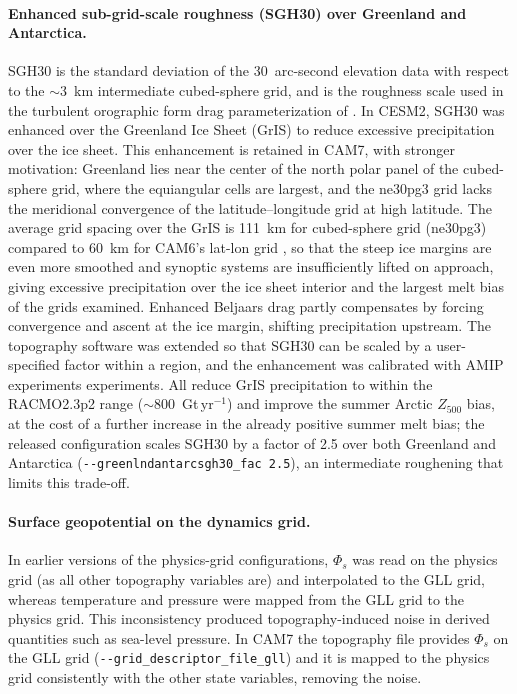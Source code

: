 \documentclass[draft]{agujournal2019}
\begin{document}
\paragraph{Enhanced sub-grid-scale roughness (SGH30) over Greenland and Antarctica.} SGH30 is the standard deviation of the 30~arc-second elevation data with respect to the $\sim$3~km intermediate cubed-sphere grid, and is the roughness scale used in the turbulent orographic form drag parameterization of . In CESM2, SGH30 was enhanced over the Greenland Ice Sheet (GrIS) to reduce excessive precipitation over the ice sheet. This enhancement is retained in CAM7, with stronger motivation: Greenland lies near the center of the north polar panel of the cubed-sphere grid, where the equiangular cells are largest, and the ne30pg3 grid lacks the meridional convergence of the latitude--longitude grid at high latitude. The average grid spacing over the GrIS is 111~km for cubed-sphere grid (ne30pg3) compared to 60~km for CAM6's lat-lon grid  \cite{refprof}, so that the steep ice margins are even more smoothed and synoptic systems are insufficiently lifted on approach, giving excessive precipitation over the ice sheet interior and the largest melt bias of the grids examined. Enhanced Beljaars drag partly compensates by forcing convergence and ascent at the ice margin, shifting precipitation upstream. The topography software was extended so that SGH30 can be scaled by a user-specified factor within a region, and the enhancement was calibrated with AMIP experiments experiments. All reduce GrIS precipitation to within the RACMO2.3p2 range ($\sim$800~Gt\,yr$^{-1}$) and improve the summer Arctic $Z_{500}$ bias, at the cost of a further increase in the already positive summer melt bias; the released configuration scales SGH30 by a factor of 2.5 over both Greenland and Antarctica (\verb+--greenlndantarcsgh30_fac 2.5+), an intermediate roughening that limits this trade-off.

\paragraph{Surface geopotential on the dynamics grid.}
In earlier versions of the physics-grid configurations, $\Phi_s$ was read on the physics grid (as all other topography variables are) and interpolated to the GLL grid, whereas temperature and pressure were mapped from the GLL grid to the physics grid. This inconsistency produced topography-induced noise in derived quantities such as sea-level pressure. In CAM7 the topography file provides $\Phi_s$ on
the GLL grid (\verb+--grid_descriptor_file_gll+) and it is mapped to the physics grid consistently with the other state variables, removing the noise.
\end{document}
